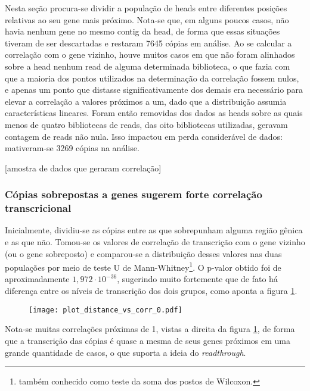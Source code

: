 \documentclass[12pt]{article}
\begin{document}
\begin{multicols}{2}
Nesta seção procura-se dividir a população de heads entre diferentes posições relativas ao seu gene mais próximo. Nota-se que, em alguns poucos casos, não havia nenhum gene no mesmo contig da head, de forma que essas situações tiveram de ser descartadas e restaram 7645 cópias em análise. Ao se calcular a correlação com o gene vizinho, houve muitos casos em que não foram alinhados sobre a head nenhum read de alguma determinada biblioteca, o que fazia com que a maioria dos pontos utilizados na determinação da correlação fossem nulos, e apenas um ponto que distasse significativamente dos demais era necessário para elevar a correlação a valores próximos a um, dado que a distribuição assumia características lineares. Foram então removidas dos dados as heads sobre as quais menos de quatro bibliotecas de reads, das oito bibliotecas utilizadas, geravam contagem de reads não nula. Isso impactou em perda considerável de dados: mativeram-se 3269 cópias na análise.

[amostra de dados que geraram correlação]

\subsubsection{Cópias sobrepostas a genes sugerem forte correlação transcricional}
Inicialmente, dividiu-se as cópias entre as que sobrepunham alguma região gênica e as que não. Tomou-se os valores de correlação de transcrição com o gene vizinho (ou o gene sobreposto) e comparou-se a distribuição desses valores nas duas populações por meio de teste U de Mann-Whitney\footnote{também conhecido como teste da soma dos postos de Wilcoxon.}. O p-valor obtido foi de aproximadamente \(1,972 \cdot 10^{-36}\), sugerindo muito fortemente que de fato há diferença entre os níveis de transcrição dos dois grupos, como aponta a figura \ref{histintegridade}.

\begin{figure}[H]
	\centering
	\label{histintegridade}
	\texttt{[image: plot\_distance\_vs\_corr\_0.pdf]}
\end{figure}

Nota-se muitas correlações próximas de 1, vistas a direita da figura \ref{histintegridade}, de forma que a transcrição das cópias é quase a mesma de seus genes próximos em uma grande quantidade de casos, o que suporta a ideia do \textit{readthrough}.


\end{multicols}
\end{document}
